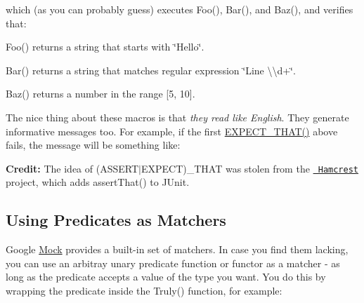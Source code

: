 which (as you can probably guess) executes {\ttfamily Foo()}, {\ttfamily Bar()}, and {\ttfamily Baz()}, and verifies that\+:


\begin{DoxyItemize}
\item {\ttfamily Foo()} returns a string that starts with {\ttfamily \char`\"{}\+Hello\char`\"{}}.
\item {\ttfamily Bar()} returns a string that matches regular expression {\ttfamily \char`\"{}\+Line \textbackslash{}\textbackslash{}d+\char`\"{}}.
\item {\ttfamily Baz()} returns a number in the range \mbox{[}5, 10\mbox{]}.
\end{DoxyItemize}

The nice thing about these macros is that {\itshape they read like English}. They generate informative messages too. For example, if the first {\ttfamily \mbox{\hyperlink{googletest-master_2googlemock_2include_2gmock_2gmock-matchers_8h_ac31e206123aa702e1152bb2735b31409}{E\+X\+P\+E\+C\+T\+\_\+\+T\+H\+A\+T()}}} above fails, the message will be something like\+:


\begin{DoxyCode}{0}
\end{DoxyCode}


{\bfseries{Credit\+:}} The idea of {\ttfamily (A\+S\+S\+E\+R\+T$\vert$\+E\+X\+P\+E\+CT)\+\_\+\+T\+H\+AT} was stolen from the \href{https://github.com/hamcrest/}{\texttt{ Hamcrest}} project, which adds {\ttfamily assert\+That()} to J\+Unit.

\subsection*{Using Predicates as Matchers}

Google \mbox{\hyperlink{class_mock}{Mock}} provides a built-\/in set of matchers. In case you find them lacking, you can use an arbitray unary predicate function or functor as a matcher -\/ as long as the predicate accepts a value of the type you want. You do this by wrapping the predicate inside the {\ttfamily Truly()} function, for example\+:


\begin{DoxyCode}{0}
\DoxyCodeLine{}
\DoxyCodeLine{}
\end{DoxyCode}


